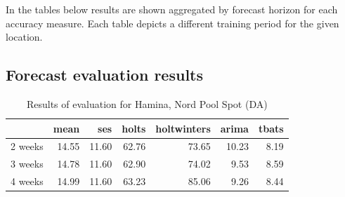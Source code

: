 In the tables below results are shown aggregated by forecast horizon for each accuracy measure. Each table depicts a different training period for the given location. 



\subsection{Forecast evaluation results}

\begin{table}[ht]
\centering
\begin{tabular}{rrrrrrr}
  \hline
 & mean & ses & holts & holtwinters & arima & tbats \\ 
  \hline
2 weeks & 14.55 & 11.60 & 62.76 & 73.65 & 10.23 & 8.19 \\ 
  3 weeks & 14.78 & 11.60 & 62.90 & 74.02 & 9.53 & 8.59 \\ 
  4 weeks & 14.99 & 11.60 & 63.23 & 85.06 & 9.26 & 8.44 \\ 
   \hline
\end{tabular}
\caption{Results of evaluation for Hamina, Nord Pool Spot (DA)} 
\end{table}


